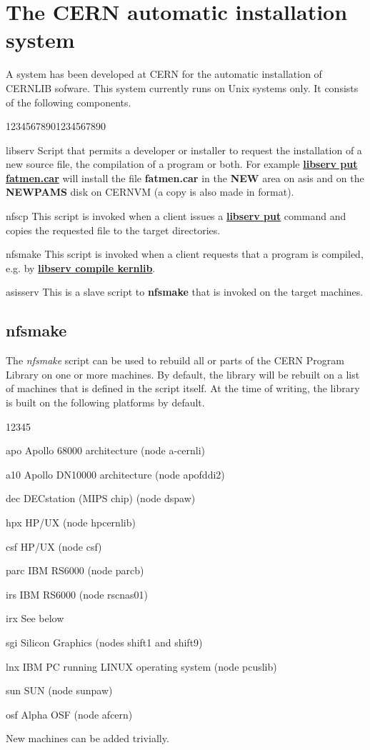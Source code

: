 \chapter{The CERN automatic installation system}

A system has been developed at CERN for the automatic
installation of CERNLIB sofware. This system currently
runs on Unix systems only. It consists of the following
components.

\begin{DLtt}{12345678901234567890}
\item[libserv]Script that permits a developer or installer to request
the installation of a new source file, the compilation of a program
or both. For example {\underline {\bf libserv put fatmen.car}} will
install the file {\bf fatmen.car} in the {\bf NEW} area on asis
and on the {\bf NEWPAMS} disk on CERNVM (a copy is also made in \CMZ{}
format).
\item[nfscp]This script is invoked when a client issues a
{\underline {\bf libserv put}} command and copies the requested
file to the target directories.
\item[nfsmake]This script is invoked when a client requests that a
program is compiled, e.g. by {\underline {\bf libserv compile kernlib}}.
\item[asisserv]This is a slave script to {\bf nfsmake} that is invoked
on the target machines. 
\end{DLtt}

\section{nfsmake}

The {\it nfsmake} script can be used to rebuild all or parts of
the CERN Program Library on one or more machines. By default,
the library will be rebuilt on a list of machines that is defined
in the script itself. At the time of writing, the library is built
on the following platforms by default.

\begin{DLtt}{12345}
\item[apo]Apollo 68000 architecture (node a-cernli)
\item[a10]Apollo DN10000 architecture (node apofddi2)
\item[dec]DECstation (MIPS chip) (node dspaw)
\item[hpx]HP/UX (node hpcernlib)
\item[csf]HP/UX (node csf)
\item[parc]IBM RS6000 (node parcb)
\item[irs]IBM RS6000 (node rscnas01)
\item[irx]See below
\item[sgi]Silicon Graphics (nodes shift1 and shift9)
\item[lnx]IBM PC running LINUX operating system (node pcuslib)
\item[sun]SUN (node sunpaw)
\item[osf]Alpha OSF (node afcern)
\end{DLtt}

New machines can be added trivially.

